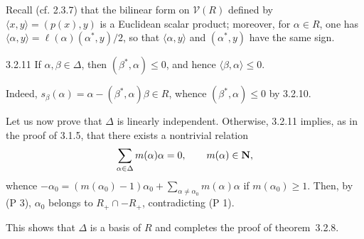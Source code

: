 Recall (cf. 2.3.7) that the bilinear form on $\mathcal V(R)$ defined by $\langle x,y\rangle=(p(x),y)$ is a Euclidean scalar product; moreover, for $\alpha\in R$, one has $\langle\alpha,y\rangle=\ell(\alpha)(\alpha^*,y)/2$, so that $\langle\alpha,y\rangle$ and $(\alpha^*,y)$ have the same sign.
\begin{lemma}{3.2.11}\label{XXI.3.2.11}
If $\alpha,\beta\in\Delta$, then $(\beta^*,\alpha)\leq0$, and hence $\langle\beta,\alpha\rangle\leq0$.
\end{lemma}
Indeed, $s_\beta(\alpha)=\alpha-(\beta^*,\alpha)\beta\in R$, whence $(\beta^*,\alpha)\leq0$ by 3.2.10.

Let us now prove that $\Delta$ is linearly independent. Otherwise, 3.2.11 implies, as in the proof of 3.1.5, that there exists a nontrivial relation
\[
\sum_{\alpha\in\Delta}m(\alpha)\alpha=0,\qquad m(\alpha)\in\mathbf{N},
\]
whence $-\alpha_0=(m(\alpha_0)-1)\alpha_0+\sum_{\alpha\ne\alpha_0}m(\alpha)\alpha$ if $m(\alpha_0)\geq1$. Then, by (P 3), $\alpha_0$ belongs to $R_+\cap-R_+$, contradicting (P 1).

This shows that $\Delta$ is a basis of $R$ and completes the proof of theorem~3.2.8.

